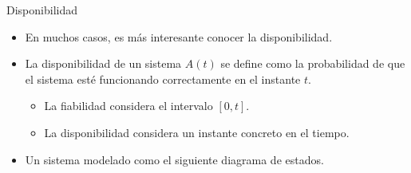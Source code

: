 \begin{frame}[t]{Disponibilidad}
\begin{itemize}
  \item En muchos casos, es más interesante conocer la disponibilidad.
  \item La disponibilidad de un sistema $A(t)$ se define como
        la probabilidad de que el sistema esté funcionando correctamente
        en el instante $t$.
    \begin{itemize}
      \item La fiabilidad considera el intervalo $[0,t]$.
      \item La disponibilidad considera un instante concreto en el tiempo.
    \end{itemize}
  \item Un sistema modelado como el siguiente diagrama de estados.
\end{itemize}
\begin{center}
\end{center}
\end{frame}


